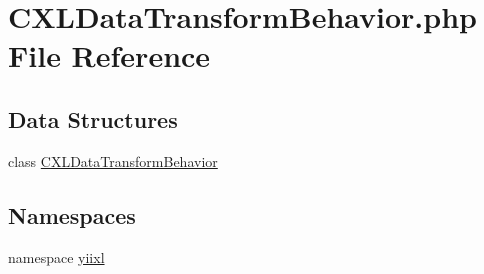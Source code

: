 \hypertarget{CXLDataTransformBehavior_8php}{
\section{CXLDataTransformBehavior.php File Reference}
\label{CXLDataTransformBehavior_8php}
}
\subsection*{Data Structures}
\begin{DoxyCompactItemize}
\item 
class \hyperlink{classCXLDataTransformBehavior}{CXLDataTransformBehavior}
\end{DoxyCompactItemize}
\subsection*{Namespaces}
\begin{DoxyCompactItemize}
\item 
namespace \hyperlink{namespaceyiixl}{yiixl}
\end{DoxyCompactItemize}
